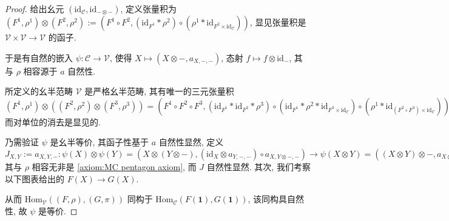 \begin{theorem}
\begin{proof}
        给出幺元 \((\mathrm{id}_{\mathcal{C}},\mathrm{id}_{- \otimes -})\), 定义张量积为 
        \((F^1,\rho^1) \otimes (F^2,\rho^2) := (F^1 \circ F^2, (\mathrm{id}_{F^1} \ast \rho^2) \circ (\rho^1 \ast \mathrm{id}_{F^2 \times \mathrm{id}_\mathcal{C}}))\),
        显见张量积是 \(\mathcal{V} \times \mathcal{V} \to \mathcal{V}\) 的函子.

        于是有自然的嵌入 \(\psi : \mathcal{C} \to \mathcal{V}\), 使得 \(X \mapsto (X \otimes -,a_{X,-,-})\),
        态射 \(f \mapsto f \otimes \mathrm{id}_{-}\), 其与 \(\rho\) 相容源于 \(a\) 自然性.

        所定义的幺半范畴 \(\mathcal{V}\) 是严格幺半范畴, 其有唯一的三元张量积
        \((F^1,\rho^1) \otimes ((F^2,\rho^2) \otimes (F^3,\rho^3)) = (F^1 \circ F^2 \circ F^3, (\mathrm{id}_{F^1} \ast \mathrm{id}_{F^2} \ast \rho^3) \circ (\mathrm{id}_{F^1} \ast \rho^2 \ast \mathrm{id}_{F^3 \times \mathrm{id}_\mathcal{C}}) \circ (\rho^1 \ast \mathrm{id}_{(F^2 \circ F^3) \times \mathrm{id}_{\mathcal{C}}}))\)
        而对单位的消去是显见的.

        乃需验证 \(\psi\) 是幺半等价, 其函子性基于 \(a\) 自然性显然, 定义 
        \(J_{X,Y} := a_{X,Y,-} : \psi(X) \otimes \psi(Y) = (X \otimes (Y \otimes -), (\mathrm{id}_X \otimes a_{Y,-,-}) \circ a_{X,Y \otimes -,-}) \to \psi(X \otimes Y) = ((X \otimes Y) \otimes -,a_{X \otimes Y,-,-})\)
        其与 \(\rho\) 相容无非是 \ref{axiom:MC pentagon axiom}, 而 \(J\) 自然性显然. 其次, 我们考察以下图表给出的 \(F(X) \to G(X)\).

        \begin{center}
        \end{center}

        从而 \(\mathrm{Hom}_{\mathcal{V}} ((F,\rho),(G,\pi))\) 同构于 \(\mathrm{Hom}_{\mathcal{C}} (F(\mathbf{1}),G(\mathbf{1}))\),
        该同构具自然性, 故 \(\psi\) 是等价.
    \end{proof}
\end{theorem}

